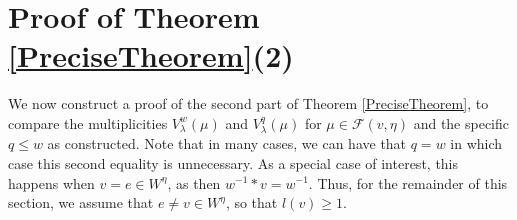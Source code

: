 \documentclass[12pt,reqno]{amsart}
\newtheorem{theorem}{Theorem}[section]
\theoremstyle{definition}
\begin{document}
%
%
%
%









\section{Proof of Theorem \ref{PreciseTheorem}(2)}

We now construct a proof of the second part of Theorem \ref{PreciseTheorem}, to compare the multiplicities $V_\lambda^w(\mu)$ and $V_\lambda^q(\mu)$ for $\mu \in \mathcal{F}(v, \eta)$ and the specific $q \leq w$ as constructed. Note that in many cases, we can have that $q=w$ in which case this second equality is unnecessary. As a special case of interest, this happens when $v=e \in W^\eta$, as then $w^{-1} \ast v = w^{-1}$. Thus, for the remainder of this section, we assume that $e \neq v \in W^\eta$, so that $l(v) \geq 1$. 
\end{document}
